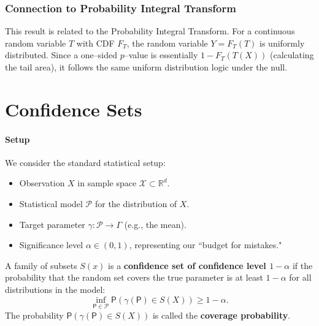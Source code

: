 \subsubsection{Connection to Probability Integral Transform}
This result is related to the Probability Integral Transform. For a continuous random variable $T$ with CDF $F_T$, the random variable $Y = F_T(T)$ is uniformly distributed.
Since a one--sided \(p\)--value is essentially $1 - F_T(T(X))$ (calculating the tail area), it follows the same uniform distribution logic under the null.

\section{Confidence Sets}
\label{sec:confidence_sets}

\paragraph{Setup}
We consider the standard statistical setup:
\begin{itemize}
    \item Observation $X$ in sample space $\mathcal{X} \subset \mathbb{R}^d$.
    \item Statistical model $\mathcal{P}$ for the distribution of $X$.
    \item Target parameter $\gamma: \mathcal{P} \to \Gamma$ (e.g., the mean).
    \item Significance level $\alpha \in (0, 1)$, representing our ``budget for mistakes."
\end{itemize}

\medskip

\begin{definition}
A family of subsets $S(x)$ is a \textbf{confidence set of confidence level $1-\alpha$} if the probability that the random set covers the true parameter is at least $1-\alpha$ for all distributions in the model:
\[
\inf_{\mathsf{P}\in\mathcal{P}}\mathsf{P}(\gamma(\mathsf{P})\in S(X)) \geq 1-\alpha.
\]
The probability $\mathsf{P}(\gamma(\mathsf{P}) \in S(X))$ is called the \textbf{coverage probability}.
\end{definition}

